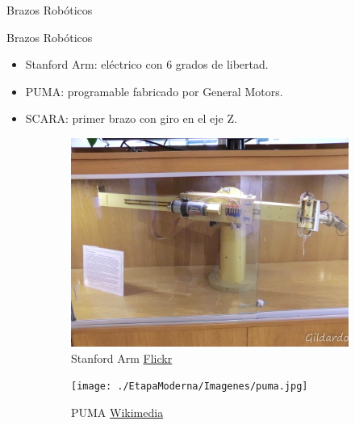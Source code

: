 \begin{frame}[fragile]{Brazos Robóticos}
\vspace{10px}
\pause
{}
\begin{block}{Brazos Robóticos}
	\begin{itemize}
		\item Stanford Arm: eléctrico con 6 grados de libertad.
		\pause
		\item PUMA: programable fabricado por General Motors.
		\pause
		\item SCARA: primer brazo con giro en el eje Z.
	\end{itemize}
\end{block}
\begin{figure}
	\centering
	\pause
	\begin{subfigure}{0.33\textwidth}
		\centering
		\includegraphics[scale=0.08]{./EtapaModerna/Imagenes/stanford_arm.jpg}
		\caption{Stanford Arm \href{https://www.flickr.com/photos/gildardo/6186967797}{Flickr}}
	\end{subfigure}
	\pause
	\begin{subfigure}{0.32\textwidth}
		\centering
		\texttt{[image: ./EtapaModerna/Imagenes/puma.jpg]}
		\caption{PUMA \href{https://es.m.wikipedia.org/wiki/Archivo:Puma_Robotic_Arm_-_GPN-2000-001817.jpg}{Wikimedia}}
	\end{subfigure}
	\pause
	\begin{subfigure}{0.33\textwidth}
		\centering

\end{subfigure}
\end{figure}
\end{frame}
